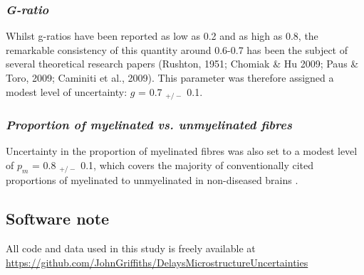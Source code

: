 
\subsubsection*{\textit{G-ratio}}

Whilst g-ratios have been reported as low as 0.2 and as high as 0.8, the
remarkable consistency of this quantity around 0.6-0.7 has been the
subject of several theoretical research papers (Rushton, 1951; Chomiak
\& Hu 2009; Paus \& Toro, 2009; Caminiti et al., 2009). This parameter
was therefore assigned a modest level of uncertainty: $g$ = 0.7 $_{+/-}$
0.1. 

\subsubsection*{\textit{Proportion of myelinated vs. unmyelinated fibres}}

Uncertainty in the proportion of myelinated fibres was
also set to a modest level of $p_{m}$ = 0.8 $_{+/-}$ 0.1, which covers
the majority of conventionally cited proportions of myelinated to
unmyelinated in non-diseased brains  \cite{bowley2010age}.

 
\subsection{Software note}

All code and data used in this study is freely available at \href{\url{https://github.com/JohnGriffiths/DelaysMicrostructureUncertainties} 


    
}{\url{https://github.com/JohnGriffiths/DelaysMicrostructureUncertainties} 
}


